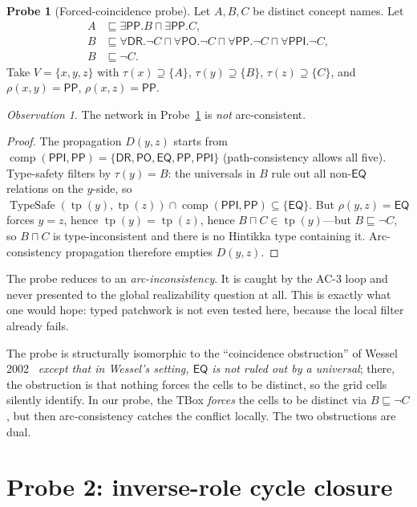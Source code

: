 \documentclass[11pt]{article}
\theoremstyle{definition}
\newtheorem{probe}[theorem]{Probe}
\theoremstyle{remark}
\newtheorem{observation}[theorem]{Observation}
\newcommand{\DR}{\mathsf{DR}}
\newcommand{\PO}{\mathsf{PO}}
\newcommand{\PP}{\mathsf{PP}}
\newcommand{\PPI}{\mathsf{PPI}}
\newcommand{\EQ}{\mathsf{EQ}}
\newcommand{\RCCall}{\{\DR,\PO,\EQ,\PP,\PPI\}}
\newcommand{\tp}{\operatorname{tp}}
\newcommand{\comp}{\operatorname{comp}}
\newcommand{\TypeSafe}{\operatorname{TypeSafe}}
\begin{document}
\begin{probe}[Forced-coincidence probe]
\label{probe:fc}
Let $A, B, C$ be distinct concept names.  Let
\begin{align*}
  A &\sqsubseteq \exists \PP. B \sqcap \exists \PP. C, \\
  B &\sqsubseteq \forall \DR. \neg C
      \sqcap \forall \PO. \neg C
      \sqcap \forall \PP. \neg C
      \sqcap \forall \PPI. \neg C, \\
  B &\sqsubseteq \neg C.
\end{align*}
Take $V = \{x, y, z\}$ with $\tau(x) \supseteq \{A\}$,
$\tau(y) \supseteq \{B\}$, $\tau(z) \supseteq \{C\}$, and
$\rho(x,y) = \PP$, $\rho(x,z) = \PP$.
\end{probe}

\begin{observation}
\label{obs:fc-fail}
The network in Probe~\ref{probe:fc} is \emph{not} arc-consistent.
\end{observation}

\begin{proof}
The propagation $D(y,z)$ starts from
$\comp(\PPI, \PP) = \RCCall$ (path-consistency allows all five).
Type-safety filters by $\tau(y) = B$: the universals in $B$ rule out
all non-$\EQ$ relations on the $y$-side, so
$\TypeSafe(\tp(y), \tp(z)) \cap \comp(\PPI, \PP) \subseteq \{\EQ\}$.
But $\rho(y, z) = \EQ$ forces $y = z$, hence $\tp(y) = \tp(z)$,
hence $B \sqcap C \in \tp(y)$---but $B \sqsubseteq \neg C$, so
$B \sqcap C$ is type-inconsistent and there is no Hintikka type
containing it.  Arc-consistency propagation therefore empties
$D(y, z)$.
\end{proof}

The probe reduces to an \emph{arc-inconsistency}.  It is caught by
the AC-3 loop and never presented to the global realizability
question at all.  This is exactly what one would hope: typed
patchwork is not even tested here, because the local filter
already fails.

The probe is structurally isomorphic to the ``coincidence
obstruction'' of Wessel 2002~\cite[Fig.~11]{Report7} \emph{except
that in Wessel's setting, $\EQ$ is not ruled out by a universal};
there, the obstruction is that nothing forces the cells to be
distinct, so the grid cells silently identify.  In our probe, the
TBox \emph{forces} the cells to be distinct via $B \sqsubseteq
\neg C$, but then arc-consistency catches the conflict locally.
The two obstructions are dual.

\section{Probe 2: inverse-role cycle closure}
\label{sec:probe2}
\end{document}
